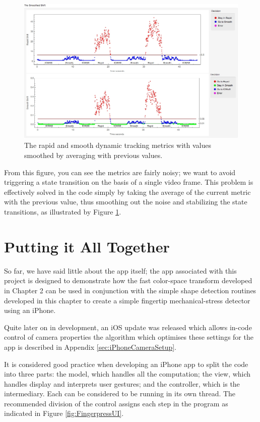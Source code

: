 \begin{figure}[tbph]
\centering
\includegraphics[width=0.95\linewidth]{Chapter4/Figs/smoothedShiftGrfx}
\caption{The rapid and smooth dynamic tracking metrics with values smoothed by averaging with previous values.}
\label{fig:smoothedshiftgrfx}
\end{figure}

From this figure, you can see the metrics are fairly noisy; we want to avoid triggering a state transition on the basis of a single video frame. This problem is effectively solved in the code simply by taking the average of the current metric with the previous value, thus smoothing out the noise and stabilizing the state transitions, as illustrated by Figure \ref{fig:smoothedshiftgrfx}.

\section{Putting it All Together}\label{sec:PuttingItAllTogether}
So far, we have said little about the app itself; the app associated with this project is designed to demonstrate how the fast color-space transform developed in Chapter 2 can be used in conjunction with the simple shape detection routines developed in this chapter to create a simple fingertip mechanical-stress detector using an iPhone.

Quite later on in development, an iOS update was released which allows in-code control of camera properties the algorithm which optimises these settings for the app is described in Appendix \ref{sec:iPhoneCameraSetup}.

It is considered good practice when developing an iPhone app to split the code into three parts: the model, which handles all the computation; the view, which handles display and interprets user gestures; and the controller, which is the intermediary. Each can be considered to be running in its own thread. The recommended division of the control assigns each step in the program as indicated in Figure \ref{fig:FingerpressUI}. 

